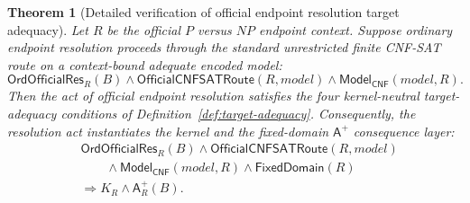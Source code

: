 \documentclass[11pt]{article}
\newtheorem{theorem}{Theorem}[section]
\theoremstyle{definition}
\theoremstyle{remark}
\newcommand{\Aplus}{\mathsf{A}^{+}}
\newcommand{\FixedDom}{\mathsf{FixedDomain}}
\newcommand{\ModelOfCnf}{\mathsf{Model}_{\mathsf{CNF}}}
\newcommand{\OrdOfficialRes}{\mathsf{OrdOfficialRes}}
\newcommand{\OfficialCNFSATRoute}{\mathsf{OfficialCNFSATRoute}}
\begin{document}
\begin{theorem}[Detailed verification of official endpoint resolution target adequacy]\label{thm:official-resolution-satisfies-target-adequacy}
Let \(R\) be the official \(P\) versus \(NP\) endpoint context. Suppose ordinary endpoint resolution proceeds through the standard unrestricted finite CNF-SAT route on a context-bound adequate encoded model:
\[
  \OrdOfficialRes_R(B)\wedge \OfficialCNFSATRoute(R,model)
  \wedge \ModelOfCnf(model,R).
\]
Then the act of official endpoint resolution satisfies the four kernel-neutral target-adequacy conditions of Definition~\ref{def:target-adequacy}. Consequently, the resolution act instantiates the kernel and the fixed-domain \(\Aplus\) consequence layer:
\[
\begin{aligned}
  &\OrdOfficialRes_R(B)\wedge \OfficialCNFSATRoute(R,model)\\
  &\qquad\wedge\ModelOfCnf(model,R)\wedge\FixedDom(R)\\
  &\Rightarrow K_R\wedge \Aplus_R(B).
\end{aligned}
\]
\end{theorem}
\end{document}
